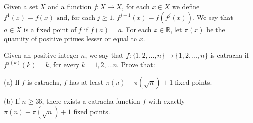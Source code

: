 Given a set $X$ and a function $f: X \rightarrow X$,  for each $x \in X$ we define $f^1(x)=f(x)$ and, for each $j \ge 1$,  $f^{j+1}(x)=f(f^j(x))$. We say that $a \in X$ is a fixed point of $f$ if $f(a)=a$. For each $x \in \mathbb{R}$,  let $\pi (x)$ be the quantity of positive primes lesser or equal to $x$.

Given an positive integer $n$,  we say that $f: \{1,2, \dots, n\} \rightarrow \{1,2, \dots, n\}$ is catracha if $f^{f(k)}(k)=k$,  for every $k=1, 2, \dots n$. Prove that:

(a) If $f$ is catracha, $f$ has at least $\pi (n) -\pi (\sqrt{n}) +1$ fixed points.

(b) If $n \ge 36$,  there exists a catracha function $f$ with exactly $ \pi (n) -\pi (\sqrt{n}) + 1$ fixed points.